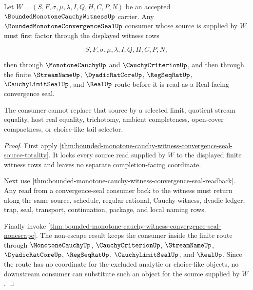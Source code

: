 \begin{theorem}
\label{thm:bounded-monotone-cauchy-witness-convergence-seal-source-lock}
Let $W=(S,F,\sigma,\mu,\lambda,I,Q,H,C,P,N)$ be an accepted $\BoundedMonotoneCauchyWitnessUp$ carrier. Any $\BoundedMonotoneConvergenceSealUp$ consumer whose source is supplied by $W$ must first factor through the displayed witness rows

$$
S,F,\sigma,\mu,\lambda,I,Q,H,C,P,N,
$$

then through $\MonotoneCauchyUp$ and $\CauchyCriterionUp$, and then through the finite $\StreamNameUp$, $\DyadicRatCoreUp$, $\RegSeqRatUp$, $\CauchyLimitSealUp$, and $\RealUp$ route before it is read as a Real-facing convergence seal.

The consumer cannot replace that source by a selected limit, quotient stream equality, host real equality, trichotomy, ambient completeness, open-cover compactness, or choice-like tail selector.
\end{theorem}
\begin{proof}
First apply \autoref{thm:bounded-monotone-cauchy-witness-convergence-seal-source-totality}. It locks every source read supplied by $W$ to the displayed finite witness rows and leaves no separate completion-facing coordinate.

Next use \autoref{thm:bounded-monotone-cauchy-witness-convergence-seal-readback}. Any read from a convergence-seal consumer back to the witness must return along the same source, schedule, regular-rational, Cauchy-witness, dyadic-ledger, trap, seal, transport, continuation, package, and local naming rows.

Finally invoke \autoref{thm:bounded-monotone-cauchy-witness-convergence-seal-nonescape}. The non-escape result keeps the consumer inside the finite route through $\MonotoneCauchyUp$, $\CauchyCriterionUp$, $\StreamNameUp$, $\DyadicRatCoreUp$, $\RegSeqRatUp$, $\CauchyLimitSealUp$, and $\RealUp$. Since the route has no coordinate for the excluded analytic or choice-like objects, no downstream consumer can substitute such an object for the source supplied by $W$.
\end{proof}

